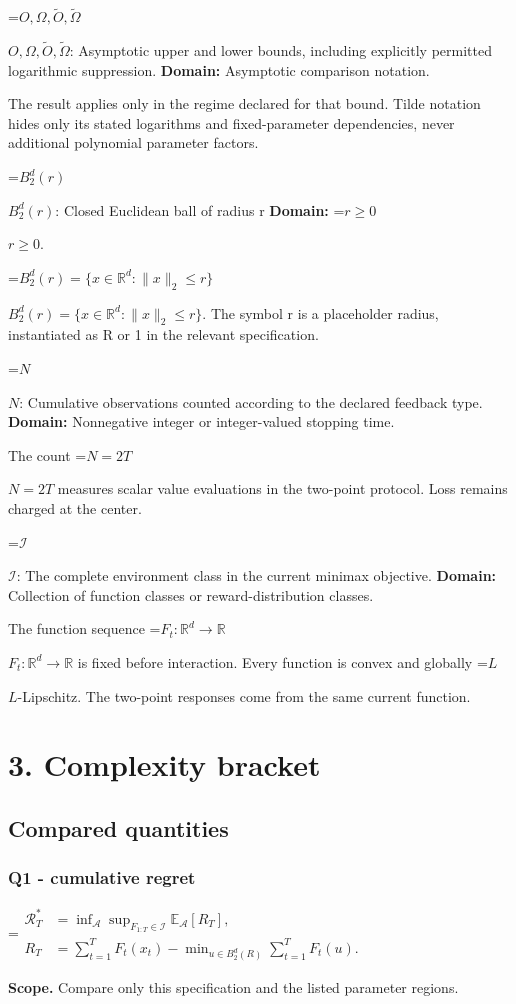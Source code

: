 \documentclass[10pt,a4paper]{article}
\newcommand{\AtlasMath}[1]{\par\begingroup\centering\setbox0=\hbox{$\displaystyle #1$}\ifdim\wd0>1.4\linewidth\typeout{ATLAS WIDE FORMULA: \the\wd0}\fi\ifdim\wd0>\linewidth\resizebox{\linewidth}{!}{\box0}\else\box0\fi\par\endgroup}
\newcommand{\AtlasInlineMath}[1]{\begingroup\setbox0=\hbox{$#1$}\ifdim\wd0>.4\linewidth\endgroup\AtlasMath{#1}\else\endgroup$#1$\fi}
\begin{document}
\AtlasInlineMath{O,\Omega,\widetilde O,\widetilde\Omega}: Asymptotic upper and lower bounds, including explicitly permitted logarithmic suppression. \textbf{Domain:} Asymptotic comparison notation.

The result applies only in the regime declared for that bound. Tilde notation hides only its stated logarithms and fixed-parameter dependencies, never additional polynomial parameter factors.

\AtlasInlineMath{B_2^d(r)}: Closed Euclidean ball of radius r \textbf{Domain:} \AtlasInlineMath{r\ge0}.

\AtlasInlineMath{B_2^d(r)=\{x\in\mathbb R^d:\|x\|_2\le r\}}. The symbol r is a placeholder radius, instantiated as R or 1 in the relevant specification.

\AtlasInlineMath{N}: Cumulative observations counted according to the declared feedback type. \textbf{Domain:} Nonnegative integer or integer-valued stopping time.

The count \AtlasInlineMath{N=2T} measures scalar value evaluations in the two-point protocol. Loss remains charged at the center.

\AtlasInlineMath{\mathcal I}: The complete environment class in the current minimax objective. \textbf{Domain:} Collection of function classes or reward-distribution classes.

The function sequence \AtlasInlineMath{F_t:\mathbb R^d\to\mathbb R} is fixed before interaction. Every function is convex and globally \AtlasInlineMath{L}-Lipschitz. The two-point responses come from the same current function.

\section{3. Complexity bracket}
\subsection{Compared quantities}
\subsubsection{Q1 - cumulative regret}
\AtlasMath{\begin{aligned}\mathcal R_T^*&=\inf_{\mathcal A}\sup_{F_{1:T}\in\mathcal I}\mathbb E_{\mathcal A}[R_T],\\ R_T&=\sum_{t=1}^T F_t(x_t)-\min_{u\in B_2^d(R)}\sum_{t=1}^T F_t(u).\end{aligned}}
\textbf{Scope.} Compare only this specification and the listed parameter regions.
\end{document}

